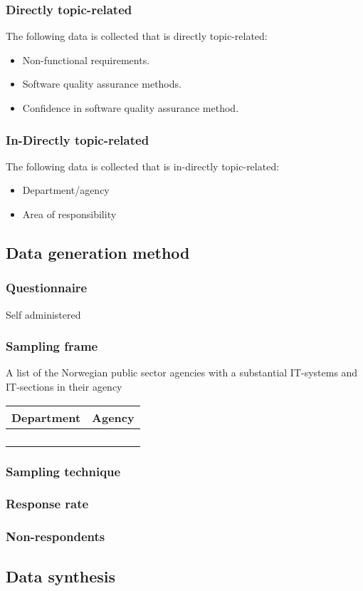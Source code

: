 
\subsubsection{Directly topic-related}
The following data is collected that is directly topic-related:
\begin{itemize}
    \item Non-functional requirements.
    \item Software quality assurance methods.
    \item Confidence in software quality assurance method.
\end{itemize}

\subsubsection{In-Directly topic-related}
The following data is collected that is in-directly topic-related:
\begin{itemize}
    \item Department/agency 
    \item Area of responsibility
\end{itemize}

\subsection{Data generation method}

\subsubsection{Questionnaire}
Self administered


\subsubsection{Sampling frame}
A list of the Norwegian public sector agencies with a substantial IT-systems and IT-sections in their agency

\begin{table}[H]
\begin{tabular}{ll}
\hline
Department & Agency \\ \hline
           &        \\
           &        \\
           &        \\
           &        \\ \hline
\end{tabular}%
\end{table}
\subsubsection{Sampling technique}

\subsubsection{Response rate}

\subsubsection{Non-respondents}


\subsection{Data synthesis}